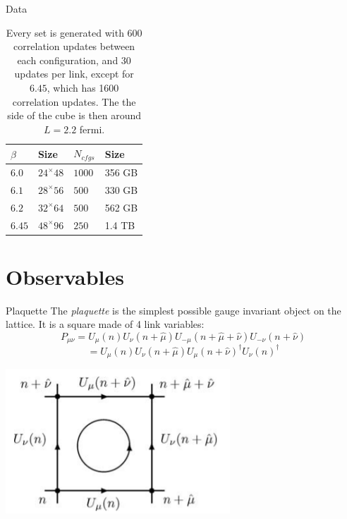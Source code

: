 \documentclass[10pt]{beamer}
\begin{document}
\begin{frame}{Data}
	\begin{table}
		\caption{Every set is generated with 600 correlation updates between each configuration, and 30 updates per link, except for $6.45$, which has 1600 correlation updates. The the side of the cube is then around $L=2.2$ fermi.}
		\begin{tabular}{l | l | l | l}
			$\beta$ & Size & $N_{cfgs}$ & Size \\ \hline
			$6.0$ & $24^\times 48$ & $1000$ & 356 GB \\
			$6.1$ & $28^\times 56$ & $500$ & 330 GB\\
			$6.2$ & $32^\times 64$ & $500$ & 562 GB\\
			$6.45$ & $48^\times 96$ & $250$ & 1.4 TB\\
		\end{tabular}
		\label{tab:data_batches}
	\end{table}
\end{frame}

\section{Observables}

\begin{frame}{Plaquette}
The \textit{plaquette} is the simplest possible gauge invariant object on the lattice. It is a square made of 4 link variables:
\[
P_{\mu\nu} = U_\mu(n)U_\nu(n+\hat{\mu})U_{-\mu}(n+\hat{\mu}+\hat{\nu})U_{-\nu}(n+\hat{\nu}) 
\]
\[
	= U_\mu(n)U_\nu(n+\hat{\mu})U_{\mu}(n+\hat{\nu})^\dagger U_{\nu}(n)^\dagger
\]
\begin{center}
	\includegraphics[scale=0.4]{figures/plaq.png}
\end{center}
\end{frame}
\end{document}

